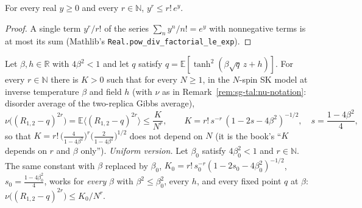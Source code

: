 \begin{lemma}\label{lem:sg-tal:pow-le-exp}
  \leanok
{}
For every real $y\ge0$ and every $r\in\mathbb N$, $y^r\le r!\,e^y$.
\end{lemma}
\begin{proof}
  \leanok
A single term $y^r/r!$ of the series $\sum_n y^n/n!=e^y$ with nonnegative terms is at most its sum (Mathlib's \texttt{Real.pow\_div\_factorial\_le\_exp}).
\end{proof}

\begin{theorem}\label{thm:sg-tal:overlap-moments-all}
  \leanok
{}
Let $\beta,h\in\mathbb R$ with $4\beta^2<1$ and let $q$ satisfy $q=\mathbb{E}[\tanh^2(\beta\sqrt q\,z+h)]$. For every $r\in\mathbb N$ there is $K>0$ such that for every $N\ge1$, in the $N$-spin SK model at inverse temperature $\beta$ and field $h$ (with $\nu$ as in Remark~\ref{rem:sg-tal:nu-notation}: disorder average of the two-replica Gibbs average),
\[
\nu\big((R_{1,2}-q)^{2r}\big)=\mathbb{E}\big\langle(R_{1,2}-q)^{2r}\big\rangle\le\frac{K}{N^{r}},\qquad
K=r!\,s^{-r}\,(1-2s-4\beta^2)^{-1/2},\quad s=\frac{1-4\beta^2}{4},
\]
so that $K=r!\,\bigl(\tfrac{4}{1-4\beta^2}\bigr)^{r}\bigl(\tfrac{2}{1-4\beta^2}\bigr)^{1/2}$ does not depend on $N$ (it is the book's ``$K$ depends on $r$ and $\beta$ only'').
\emph{Uniform version.}  Let $\beta_0$ satisfy $4\beta_0^2<1$ and $r\in\mathbb N$.  The same constant with $\beta$ replaced by $\beta_0$, $K_0=r!\,s_0^{-r}(1-2s_0-4\beta_0^2)^{-1/2}$, $s_0=\frac{1-4\beta_0^2}{4}$, works for \emph{every} $\beta$ with $\beta^2\le\beta_0^2$, every $h$, and every fixed point $q$ at $\beta$: $\nu\big((R_{1,2}-q)^{2r}\big)\le K_0/N^r$.
\end{theorem}
